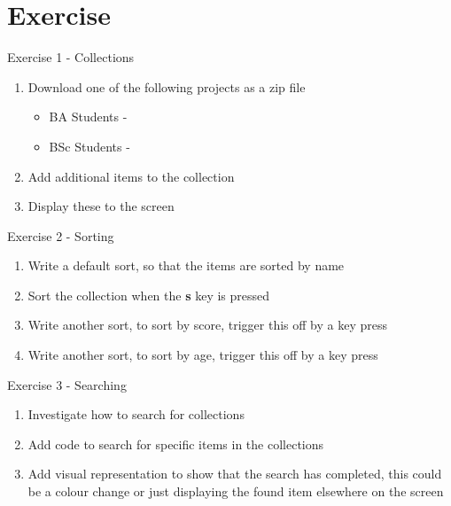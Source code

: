 \part{Exercise}
\frame{\partpage}

\begin{frame}{Exercise 1 - Collections}
	\begin{enumerate}
		\item Download one of the following projects as a zip file
		\begin{itemize}
			\item BA Students - 
			\item BSc Students -
		\end{itemize}
		\item Add additional items to the collection
		\item Display these to the screen
	\end{enumerate}
\end{frame}

\begin{frame}{Exercise 2 - Sorting}
\begin{enumerate}
	\item Write a default sort, so that the items are sorted by name
	\item Sort the collection when the \textbf{s} key is pressed
	\item Write another sort, to sort by score, trigger this off by a key press
	\item Write another sort, to sort by age, trigger this off by a key press
\end{enumerate}
\end{frame}

\begin{frame}{Exercise 3 - Searching}
\begin{enumerate}
	\item Investigate how to search for collections
	\item Add code to search for specific items in the collections 
	\item Add visual representation to show that the search has completed, this could be a colour change or just displaying the found item elsewhere on the screen
\end{enumerate}
\end{frame}
